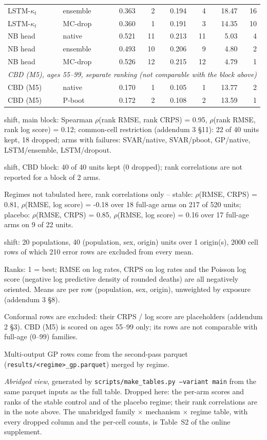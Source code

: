\begin{table}[tbp]
\begin{threeparttable}
\begin{tabular}{@{}llrrrrrr@{}}
LSTM-$\kappa_t$ & ensemble & 0.363 & 2 & 0.194 & 4 & 18.47 & 16 \\
LSTM-$\kappa_t$ & MC-drop & 0.360 & 1 & 0.191 & 3 & 14.35 & 10 \\
NB head & native & 0.521 & 11 & 0.213 & 11 & 5.03 & 4 \\
NB head & ensemble & 0.493 & 10 & 0.206 & 9 & 4.80 & 2 \\
NB head & MC-drop & 0.526 & 12 & 0.215 & 12 & 4.79 & 1 \\
\multicolumn{8}{l}{\emph{CBD (M5), ages 55--99, separate ranking (not comparable with the block above)}}} \\
\midrule
CBD (M5) & native & 0.170 & 1 & 0.105 & 1 & 13.77 & 2 \\
CBD (M5) & P-boot & 0.172 & 2 & 0.108 & 2 & 13.59 & 1 \\
\bottomrule
\end{tabular}
\begin{tablenotes}\scriptsize
\item shift, main block: Spearman $\rho$(rank RMSE, rank CRPS) = 0.95, $\rho$(rank RMSE, rank log score) = 0.12; common-cell restriction (addendum 3 \S11): 22 of 40 units kept, 18 dropped; arms with failures: SVAR/native, SVAR/pboot, GP/native, LSTM/ensemble, LSTM/dropout.
\item shift, CBD block: 40 of 40 units kept (0 dropped); rank correlations are not reported for a block of 2 arms.
\item Regimes not tabulated here, rank correlations only -- stable: $\rho$(RMSE, CRPS) = 0.81, $\rho$(RMSE, log score) = -0.18 over 18 full-age arms on 217 of 520 units; placebo: $\rho$(RMSE, CRPS) = 0.85, $\rho$(RMSE, log score) = 0.16 over 17 full-age arms on 9 of 22 units.
\item shift: 20 populations, 40 (population, sex, origin) units over 1 origin(s), 2000 cell rows of which 210 error rows are excluded from every mean.
\item Ranks: 1 = best; RMSE on log rates, CRPS on log rates and the Poisson log score (negative log predictive density of rounded deaths) are all negatively oriented. Means are per row (population, sex, origin), unweighted by exposure (addendum 3 \S8).
\item Conformal rows are excluded: their CRPS / log score are placeholders (addendum 2 \S3). CBD (M5) is scored on ages 55--99 only; its rows are not comparable with full-age (0--99) families.
\item Multi-output GP rows come from the second-pass parquet (\texttt{results/<regime>\_gp.parquet}) merged by regime.
\item \emph{Abridged view}, generated by \texttt{scripts/make\_tables.py --variant main} from the same parquet inputs as the full table. Dropped here: the per-arm scores and ranks of the stable control and of the placebo regime; their rank correlations are in the note above. The unabridged family $\times$ mechanism $\times$ regime table, with every dropped column and the per-cell counts, is Table~S2 of the online supplement.
\end{tablenotes}
\end{threeparttable}
\end{table}
